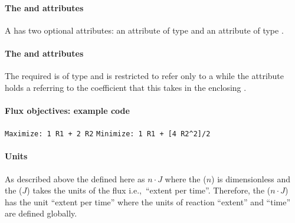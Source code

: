 \paragraph{The  and  attributes}
A \FluxObjective has two optional attributes:  an attribute of
type  and  an attribute of type .

\paragraph{The  and  attributes}
The required  is of type  and is restricted
to refer only to a \Reaction while the  attribute
holds a  referring to the coefficient that this \FluxObjective
takes in the enclosing \Objective. 


\paragraph{Flux objectives: example code}
 \verb"Maximize: 1 R1 + 2 R2"
%
%
 \verb"Minimize: 1 R1 + [4 R2^2]/2"
%

\paragraph{Units}
As described above the \FluxObjective defined here as $n\cdot J$ where
the  ($n$) is dimensionless and the  ($J$)
takes the units of the  flux i.e.,~``extent per time''.
Therefore, the \FluxObjective ($n\cdot J$)  has the unit ``extent per time''
where the units of reaction ``extent'' and ``time'' are defined globally. 







